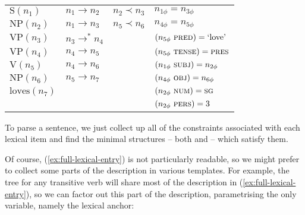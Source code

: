 \documentclass[output=paper,hidelinks]{langscibook}
\begin{document}
\ea\label{ex:full-lexical-entry}
\begin{tabular}[t]{llll}
  $\textrm{S}(n_{1})$ & $n_{1} \rightarrow n_{2}$ & $n_{2} \prec n_{3}$ & $n_{1\phi} = n_{3\phi}$\\
  $\textrm{NP}(n_{2})$ & $n_{1} \rightarrow n_{3}$ & $n_{5} \prec n_{6}$ & $n_{4\phi} = n_{5\phi}$\\
  $\textrm{VP}(n_{3})$ & $n_{3} \rightarrow^{*} n_{4}$ && $(n_{5\phi}\ \PRED) = \textrm{`love'}$\\
  $\textrm{VP}(n_{4})$ & $n_{4} \rightarrow n_{5}$ &&  $(n_{5\phi}\ \TENSE) = \textsc{pres}$\\
  $\textrm{V}(n_{5})$ & $n_{4} \rightarrow n_{6}$ && $(n_{1\phi}\ \SUBJ) = n_{2\phi}$\\
  $\textrm{NP}(n_{6})$ & $n_{5} \rightarrow n_{7}$ &&  $(n_{4\phi}\ \OBJ) = n_{6\phi}$\\
  $\textrm{loves}(n_{7})$ &                && $(n_{2\phi}\ \NUM) = \SG$\\
                          &                && $(n_{2\phi}\ \PERS) = 3$
\end{tabular}
\z
%
To parse a sentence, we just collect up all of the constraints associated with
each lexical item and find the minimal structures -- both \cstruc{} and
\fstruc{} -- which satisfy them.

Of course, (\ref{ex:full-lexical-entry}) is not particularly readable, so we
might prefer to collect some parts of the description in various templates. For
example, the tree for any transitive verb will share most of the description in
(\ref{ex:full-lexical-entry}), so we can factor out this part of the
description, parametrising the only variable, namely the lexical anchor:
\end{document}
